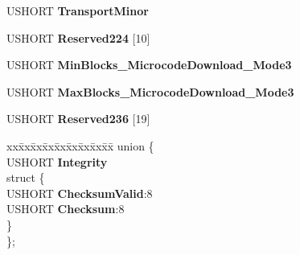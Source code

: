 \begin{DoxyCompactItemize}
\begin{tabbing}
\end{tabbing}\item 
\mbox{\label{struct___i_d_e_n_t_i_f_y___d_a_t_a_a742b12058ac9f76f1987f31ab3f644df}} 
U\+S\+H\+O\+RT {\bfseries Transport\+Minor}
\item 
\mbox{\label{struct___i_d_e_n_t_i_f_y___d_a_t_a_a62624d468ed4f0f2414cabf0208d1d60}} 
U\+S\+H\+O\+RT {\bfseries Reserved224} \mbox{[}10\mbox{]}
\item 
\mbox{\label{struct___i_d_e_n_t_i_f_y___d_a_t_a_a7bad3b7a5bda1f39d516d532176f0163}} 
U\+S\+H\+O\+RT {\bfseries Min\+Blocks\+\_\+\+Microcode\+Download\+\_\+\+Mode3}
\item 
\mbox{\label{struct___i_d_e_n_t_i_f_y___d_a_t_a_a70189f3766a5ee1e9ca73eb08ebdc4e1}} 
U\+S\+H\+O\+RT {\bfseries Max\+Blocks\+\_\+\+Microcode\+Download\+\_\+\+Mode3}
\item 
\mbox{\label{struct___i_d_e_n_t_i_f_y___d_a_t_a_aafc9ed8e4865f12f58e0670eef84cf7c}} 
U\+S\+H\+O\+RT {\bfseries Reserved236} \mbox{[}19\mbox{]}
\item 
\mbox{\label{struct___i_d_e_n_t_i_f_y___d_a_t_a_ac7ca8472b5a4c79745778d135e257689}} 
\begin{tabbing}
xx\=xx\=xx\=xx\=xx\=xx\=xx\=xx\=xx\=\kill
union \{\\
\>USHORT {\bfseries Integrity}\\
\mbox{\label{union___i_d_e_n_t_i_f_y___d_a_t_a_1_1_0D970_a2d8fc7992d8fd5f23aca1387e93b45c7}} 
\>struct \{\\
\>\>USHORT {\bfseries ChecksumValid}:8\\
\>\>USHORT {\bfseries Checksum}:8\\
\>\} \\
\}; \\


\end{tabbing}
\end{DoxyCompactItemize}
